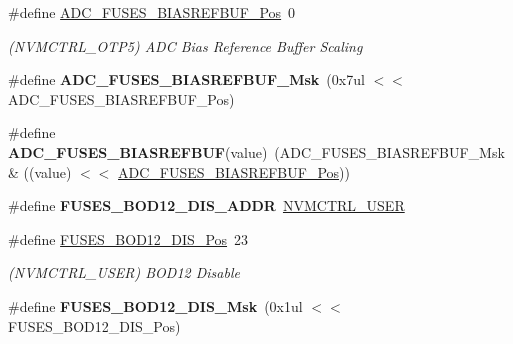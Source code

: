 \begin{DoxyCompactItemize}
\item 
\hypertarget{group__fuses__api_ga67d7c0674e88e131c0c307077393d198}{}\#define \hyperlink{group__fuses__api_ga67d7c0674e88e131c0c307077393d198}{A\+D\+C\+\_\+\+F\+U\+S\+E\+S\+\_\+\+B\+I\+A\+S\+R\+E\+F\+B\+U\+F\+\_\+\+Pos}~0\label{group__fuses__api_ga67d7c0674e88e131c0c307077393d198}

\begin{DoxyCompactList}\small\item\em (N\+V\+M\+C\+T\+R\+L\+\_\+\+O\+T\+P5) A\+D\+C Bias Reference Buffer Scaling \end{DoxyCompactList}\item 
\hypertarget{group__fuses__api_gaccf06cd88f1cb6a18dc4567177b590e6}{}\#define {\bfseries A\+D\+C\+\_\+\+F\+U\+S\+E\+S\+\_\+\+B\+I\+A\+S\+R\+E\+F\+B\+U\+F\+\_\+\+Msk}~(0x7ul $<$$<$ A\+D\+C\+\_\+\+F\+U\+S\+E\+S\+\_\+\+B\+I\+A\+S\+R\+E\+F\+B\+U\+F\+\_\+\+Pos)\label{group__fuses__api_gaccf06cd88f1cb6a18dc4567177b590e6}

\item 
\hypertarget{group__fuses__api_gadbaf05f16c4d8b6b5e261893d7745150}{}\#define {\bfseries A\+D\+C\+\_\+\+F\+U\+S\+E\+S\+\_\+\+B\+I\+A\+S\+R\+E\+F\+B\+U\+F}(value)~(A\+D\+C\+\_\+\+F\+U\+S\+E\+S\+\_\+\+B\+I\+A\+S\+R\+E\+F\+B\+U\+F\+\_\+\+Msk \& ((value) $<$$<$ \hyperlink{group__fuses__api_ga67d7c0674e88e131c0c307077393d198}{A\+D\+C\+\_\+\+F\+U\+S\+E\+S\+\_\+\+B\+I\+A\+S\+R\+E\+F\+B\+U\+F\+\_\+\+Pos}))\label{group__fuses__api_gadbaf05f16c4d8b6b5e261893d7745150}

\item 
\hypertarget{group__fuses__api_ga440a397b20f069804c7ada3662cea9b6}{}\#define {\bfseries F\+U\+S\+E\+S\+\_\+\+B\+O\+D12\+\_\+\+D\+I\+S\+\_\+\+A\+D\+D\+R}~\hyperlink{group___s_a_m_l21_j18_a__base_ga7a7a83a5753fa323b61536e396083c99}{N\+V\+M\+C\+T\+R\+L\+\_\+\+U\+S\+E\+R}\label{group__fuses__api_ga440a397b20f069804c7ada3662cea9b6}

\item 
\hypertarget{group__fuses__api_gad0ecfa8edabcaa613881d958ed6c39e9}{}\#define \hyperlink{group__fuses__api_gad0ecfa8edabcaa613881d958ed6c39e9}{F\+U\+S\+E\+S\+\_\+\+B\+O\+D12\+\_\+\+D\+I\+S\+\_\+\+Pos}~23\label{group__fuses__api_gad0ecfa8edabcaa613881d958ed6c39e9}

\begin{DoxyCompactList}\small\item\em (N\+V\+M\+C\+T\+R\+L\+\_\+\+U\+S\+E\+R) B\+O\+D12 Disable \end{DoxyCompactList}\item 
\hypertarget{group__fuses__api_ga8fc95637ef97a97129f2caa9491b6b05}{}\#define {\bfseries F\+U\+S\+E\+S\+\_\+\+B\+O\+D12\+\_\+\+D\+I\+S\+\_\+\+Msk}~(0x1ul $<$$<$ F\+U\+S\+E\+S\+\_\+\+B\+O\+D12\+\_\+\+D\+I\+S\+\_\+\+Pos)\label{group__fuses__api_ga8fc95637ef97a97129f2caa9491b6b05}


\end{DoxyCompactItemize}
